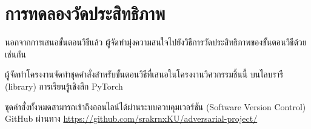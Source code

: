 \section{การทดลองวัดประสิทธิภาพ}

นอกจากการเสนอขั้นตอนวิธีแล้ว ผู้จัดทำมุ่งความสนใจไปยังวิธีการวัดประสิทธิภาพของขั้นตอนวิธีด้วยเช่นกัน

ผู้จัดทำโครงงานจัดทำชุดคำสั่งสำหรับขั้นตอนวิธีที่เสนอในโครงงานวิศวกรรมชิ้นนี้ บนไลบรารี (library) การเรียนรู้เชิงลึก PyTorch \cite{PyTorch2019}

ชุดคำสั่งทั้งหมดสามารถเข้าถึงออนไลน์ได้ผ่านระบบควบคุมเวอร์ชัน (Software Version Control) GitHub ผ่านทาง \url{https://github.com/srakrnxKU/adversarial-project/}
